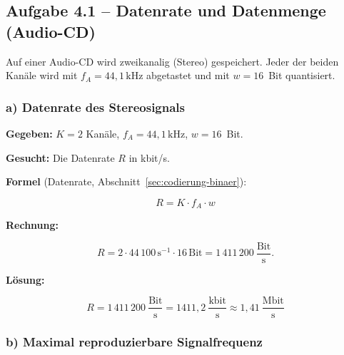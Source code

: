 
\subsection*{Aufgabe 4.1 – Datenrate und Datenmenge (Audio-CD)}

Auf einer Audio-CD wird zweikanalig (Stereo) gespeichert. Jeder der beiden Kanäle
wird mit $f_A = 44{,}1\,\text{kHz}$ abgetastet und mit $w = 16$~Bit quantisiert.

\subsubsection*{a) Datenrate des Stereosignals}

\begin{beispiel}

\textbf{Gegeben:} $K = 2$ Kanäle, $f_A = 44{,}1\,\text{kHz}$, $w = 16$~Bit.

\textbf{Gesucht:} Die Datenrate $R$ in kbit/s.

\textbf{Formel} (Datenrate, Abschnitt~\ref{sec:codierung-binaer}):

$$
R = K \cdot f_A \cdot w
$$

\textbf{Rechnung:}

$$
R = 2 \cdot 44\,100\,\text{s}^{-1} \cdot 16\,\text{Bit}
  = 1\,411\,200\ \frac{\text{Bit}}{\text{s}}.
$$

\textbf{Lösung:}

$$
\boxed{\;R = 1\,411\,200\ \frac{\text{Bit}}{\text{s}}
= 1411{,}2\ \frac{\text{kbit}}{\text{s}} \approx 1{,}41\ \frac{\text{Mbit}}{\text{s}}\;}
$$

\end{beispiel}

\subsubsection*{b) Maximal reproduzierbare Signalfrequenz}

